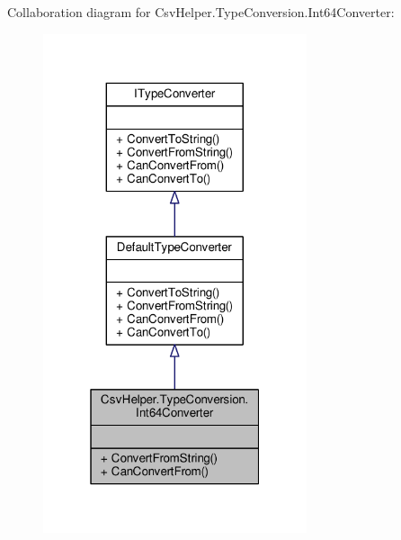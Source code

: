 Collaboration diagram for Csv\-Helper.\-Type\-Conversion.\-Int64\-Converter\-:
\nopagebreak
\begin{figure}[H]
\begin{center}
\leavevmode
\includegraphics[width=220pt]{a00552}
\end{center}
\end{figure}
